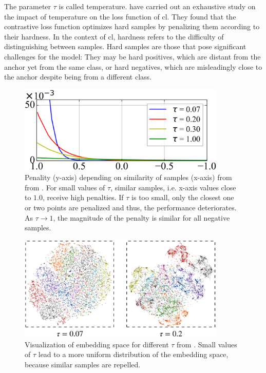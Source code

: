 The parameter $\tau$ is called temperature.
\citet{CL_temp_2021} have carried out an exhaustive study on the impact of temperature on the loss function of \ac{cl}.
They found that the contrastive loss function optimizes hard samples by penalizing them according to their hardness.
In the context of \ac{cl}, hardness refers to the difficulty of distinguishing between samples.
Hard samples are those that pose significant challenges for the model: 
They may be hard positives, which are distant from the anchor yet from the same class, 
or hard negatives, which are misleadingly close to the anchor despite being from a different class.

\begin{figure}[!htb] %
    \centering
    \includegraphics[width=280pt]{images/gradient_ratio_dep_on_temperature.png}
    \caption{Penality (y-axis) depending on similarity of samples (x-axis) from from \citet{CL_temp_2021}. 
    For small values of $\tau$, similar samples, i.e. x-axis values close to $1.0$, receive high penalties.
    If $\tau$ is too small, only the closest one or two points are penalized and thus, the performance deteriorates.
    As $\tau \rightarrow 1$, the magnitude of the penalty is similar for all negative samples.
    }
    \label{fig:gradient_ratio_dep_on_temperature}
\end{figure}

\begin{figure}[!htb] %
    \centering
    \includegraphics[width=280pt]{images/tsne_dep_on_temperature.png}
    \caption{Visualization of embedding space for different $\tau$ from \citet{CL_temp_2021}.
    Small values of $\tau$ lead to a more uniform distribution of the embedding space, 
    because similar samples are repelled.
    }
    \label{fig:tsne_dep_on_temperature}
\end{figure}

